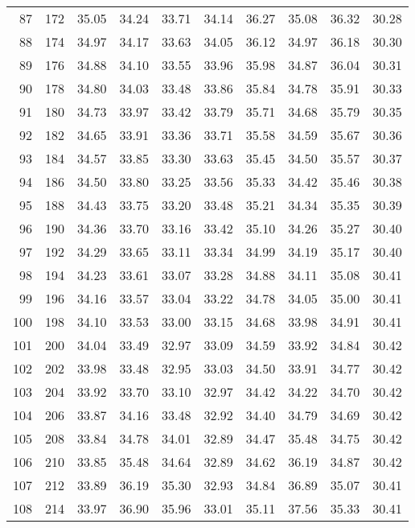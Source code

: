 \begin{longtable}{rrllllllll}
		87 & 172 & 35.05 & 34.24 & 33.71 & 34.14 & 36.27 & 35.08 & 36.32 & 30.28 \\ 
		88 & 174 & 34.97 & 34.17 & 33.63 & 34.05 & 36.12 & 34.97 & 36.18 & 30.30 \\ 
		89 & 176 & 34.88 & 34.10 & 33.55 & 33.96 & 35.98 & 34.87 & 36.04 & 30.31 \\ 
		90 & 178 & 34.80 & 34.03 & 33.48 & 33.86 & 35.84 & 34.78 & 35.91 & 30.33 \\ 
		91 & 180 & 34.73 & 33.97 & 33.42 & 33.79 & 35.71 & 34.68 & 35.79 & 30.35 \\ 
		92 & 182 & 34.65 & 33.91 & 33.36 & 33.71 & 35.58 & 34.59 & 35.67 & 30.36 \\ 
		93 & 184 & 34.57 & 33.85 & 33.30 & 33.63 & 35.45 & 34.50 & 35.57 & 30.37 \\ 
		94 & 186 & 34.50 & 33.80 & 33.25 & 33.56 & 35.33 & 34.42 & 35.46 & 30.38 \\ 
		95 & 188 & 34.43 & 33.75 & 33.20 & 33.48 & 35.21 & 34.34 & 35.35 & 30.39 \\ 
		96 & 190 & 34.36 & 33.70 & 33.16 & 33.42 & 35.10 & 34.26 & 35.27 & 30.40 \\ 
		97 & 192 & 34.29 & 33.65 & 33.11 & 33.34 & 34.99 & 34.19 & 35.17 & 30.40 \\ 
		98 & 194 & 34.23 & 33.61 & 33.07 & 33.28 & 34.88 & 34.11 & 35.08 & 30.41 \\ 
		99 & 196 & 34.16 & 33.57 & 33.04 & 33.22 & 34.78 & 34.05 & 35.00 & 30.41 \\ 
		100 & 198 & 34.10 & 33.53 & 33.00 & 33.15 & 34.68 & 33.98 & 34.91 & 30.41 \\ 
		101 & 200 & 34.04 & 33.49 & 32.97 & 33.09 & 34.59 & 33.92 & 34.84 & 30.42 \\ 
		102 & 202 & 33.98 & 33.48 & 32.95 & 33.03 & 34.50 & 33.91 & 34.77 & 30.42 \\ 
		103 & 204 & 33.92 & 33.70 & 33.10 & 32.97 & 34.42 & 34.22 & 34.70 & 30.42 \\ 
		104 & 206 & 33.87 & 34.16 & 33.48 & 32.92 & 34.40 & 34.79 & 34.69 & 30.42 \\ 
		105 & 208 & 33.84 & 34.78 & 34.01 & 32.89 & 34.47 & 35.48 & 34.75 & 30.42 \\ 
		106 & 210 & 33.85 & 35.48 & 34.64 & 32.89 & 34.62 & 36.19 & 34.87 & 30.42 \\ 
		107 & 212 & 33.89 & 36.19 & 35.30 & 32.93 & 34.84 & 36.89 & 35.07 & 30.41 \\ 
		108 & 214 & 33.97 & 36.90 & 35.96 & 33.01 & 35.11 & 37.56 & 35.33 & 30.41 \\ 

\end{longtable}
